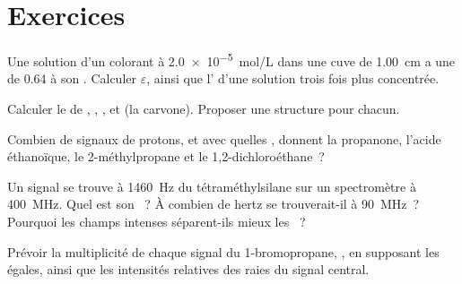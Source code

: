 \section{Exercices}

\begin{exercise}[$\star$]\label{exo:b1:structure-spectroscopy:1}
Une solution d'un colorant à \qty{2.0e-5}{mol/L} dans une cuve de
\qty{1.00}{cm} a une  de 0.64 à son .
Calculer $\varepsilon$, ainsi que l' d'une solution trois fois
plus concentrée.
\end{exercise}

\begin{exercise}[$\star$]\label{exo:b1:structure-spectroscopy:2}
Calculer le  de , ,
,  et  (la carvone). Proposer une
structure pour chacun.
\end{exercise}

\begin{exercise}[$\star$]\label{exo:b1:structure-spectroscopy:3}
Combien de signaux de protons, et avec quelles , donnent la
propanone, l'acide éthanoïque, le 2-méthylpropane et le
1,2-dichloroéthane~?
\end{exercise}

\begin{exercise}[$\star$]\label{exo:b1:structure-spectroscopy:4}
Un signal se trouve à \qty{1460}{Hz} du tétraméthylsilane sur un
spectromètre à \qty{400}{MHz}. Quel est son ~? À
combien de hertz se trouverait-il à \qty{90}{MHz}~? Pourquoi les champs
intenses séparent-ils mieux les ~?
\end{exercise}

\begin{exercise}[$\star\star$]\label{exo:b1:structure-spectroscopy:5}
Prévoir la multiplicité de chaque signal du 1-bromopropane,
, en supposant les  égales, ainsi
que les intensités relatives des raies du signal central.
\end{exercise}

